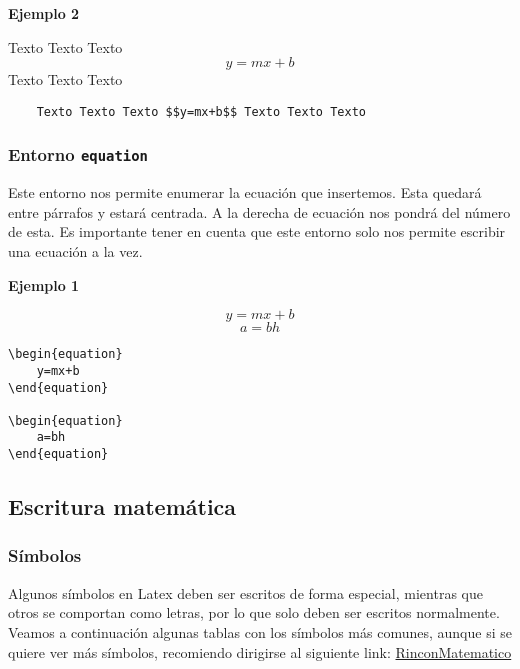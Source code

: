 \textbf{Ejemplo 2}

Texto Texto Texto $$y=mx+b$$ Texto Texto Texto 

\begin{myquote}
	\begin{lstlisting}
	Texto Texto Texto $$y=mx+b$$ Texto Texto Texto 
	\end{lstlisting}
\end{myquote}

\subsubsection{Entorno \texttt{equation}}

Este entorno nos permite enumerar la ecuación que insertemos. Esta quedará entre párrafos y estará centrada. A la derecha de ecuación nos pondrá del número de esta. Es importante tener en cuenta que este entorno solo nos permite escribir una ecuación a la vez.

\textbf{Ejemplo 1}

\begin{equation}
	y=mx+b
\end{equation}
\begin{equation}
	a=bh
\end{equation}

\begin{myquote}
	\begin{lstlisting}
\begin{equation}
	y=mx+b
\end{equation}

\begin{equation}
	a=bh
\end{equation}
	\end{lstlisting}
\end{myquote}

\subsection{Escritura matemática}

\subsubsection{Símbolos}

Algunos símbolos en Latex deben ser escritos de forma especial, mientras que otros se comportan como letras, por lo que solo deben ser escritos normalmente. Veamos a continuación algunas tablas con los símbolos más comunes, aunque si se quiere ver más símbolos, recomiendo dirigirse al siguiente link: \href{https://rinconmatematico.com/instructivolatex/formulas.htm}{\textcolor{light-blue}{RinconMatematico}}

